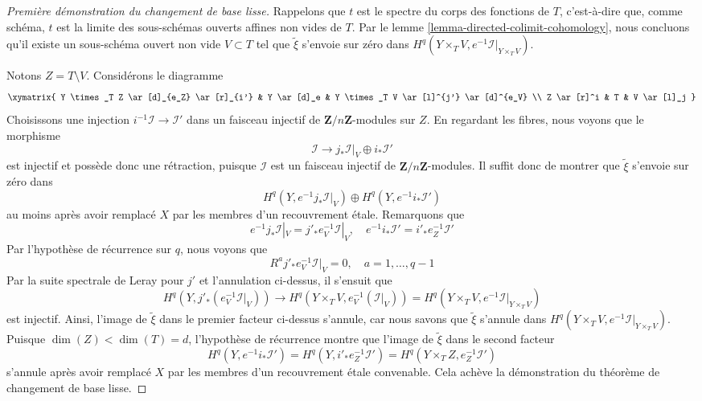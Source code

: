 \begin{proof}[Première démonstration du changement de base lisse]
\medskip\noindent
Rappelons que $t$ est le spectre du corps des fonctions de $T$, c'est-à-dire
que, comme schéma, $t$ est la limite des sous-schémas ouverts affines non vides de $T$.
Par le lemme \ref{lemma-directed-colimit-cohomology}, nous concluons qu'il existe
un sous-schéma ouvert non vide $V \subset T$ tel que $\tilde \xi$ s'envoie sur zéro dans
$H^q(Y \times_T V, e^{-1}\mathcal{I}|_{Y \times_T V})$.

\medskip\noindent
Notons $Z = T \setminus V$. Considérons le diagramme
$$
\xymatrix{
Y \times_T Z \ar[d]_{e_Z} \ar[r]_{i'} &
Y \ar[d]_e &
Y \times_T V \ar[l]^{j'} \ar[d]^{e_V} \\
Z \ar[r]^i &
T &
V \ar[l]_j
}
$$
Choisissons une injection $i^{-1}\mathcal{I} \to \mathcal{I}'$
dans un faisceau injectif de $\mathbf{Z}/n\mathbf{Z}$-modules sur $Z$.
En regardant les fibres, nous voyons que le morphisme
$$
\mathcal{I} \to j_*\mathcal{I}|_V \oplus i_*\mathcal{I}'
$$
est injectif et possède donc une rétraction, puisque $\mathcal{I}$ est un faisceau injectif
de $\mathbf{Z}/n\mathbf{Z}$-modules. Il suffit donc de montrer que
$\tilde \xi$ s'envoie sur zéro dans
$$
H^q(Y, e^{-1}j_*\mathcal{I}|_V) \oplus
H^q(Y, e^{-1}i_*\mathcal{I}')
$$
au moins après avoir remplacé $X$ par les membres d'un recouvrement étale.
Remarquons que
$$
e^{-1}j_*\mathcal{I}|_V = j'_*e_V^{-1}\mathcal{I}|_V,\quad
e^{-1}i_*\mathcal{I}' = i'_*e_Z^{-1}\mathcal{I}'
$$
Par l'hypothèse de récurrence sur $q$, nous voyons que
$$
R^aj'_*e_V^{-1}\mathcal{I}|_V = 0, \quad a = 1, \ldots, q - 1
$$
Par la suite spectrale de Leray pour $j'$ et l'annulation
ci-dessus, il s'ensuit que
$$
H^q(Y, j'_*(e_V^{-1}\mathcal{I}|_V))
\longrightarrow
H^q(Y \times_T V, e_V^{-1}(\mathcal{I}|_V)) =
H^q(Y \times_T V, e^{-1}\mathcal{I}|_{Y \times_T V})
$$
est injectif. Ainsi, l'image de $\tilde \xi$ dans le premier facteur
ci-dessus s'annule, car nous savons que $\tilde \xi$ s'annule
dans $H^q(Y \times_T V, e^{-1}\mathcal{I}|_{Y \times_T V})$.
Puisque $\dim(Z) < \dim(T) = d$, l'hypothèse de récurrence montre que l'image de $\tilde \xi$
dans le second facteur
$$
H^q(Y, e^{-1}i_*\mathcal{I}') =
H^q(Y, i'_*e_Z^{-1}\mathcal{I}') =
H^q(Y \times_T Z, e_Z^{-1}\mathcal{I}')
$$
s'annule après avoir remplacé $X$ par les membres d'un recouvrement étale convenable.
Cela achève la démonstration du théorème de changement de base lisse.
\end{proof}

